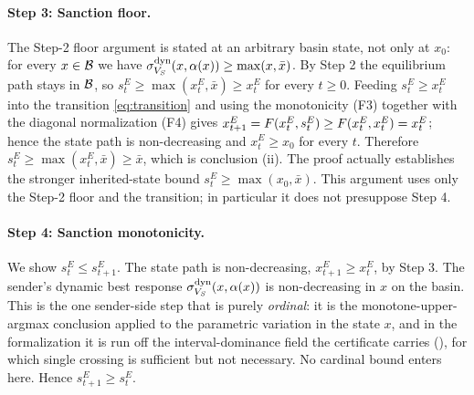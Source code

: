 \paragraph{Step 3: Sanction floor.}
The Step-2 floor argument is stated at an arbitrary basin state, not
only at $x_0$: for every $x\in\mathcal{B}$ we have
$\sigma^{\mathrm{dyn}}_{V_S}(x,\alpha(x))\ge\max(x,\bar x)$. By Step 2 the
equilibrium path stays in $\mathcal{B}$, so $s^E_t\ge\max(x^E_t,\bar
x)\ge x^E_t$ for every $t\ge0$. Feeding $s^E_t\ge x^E_t$ into the
transition \eqref{eq:transition} and using the monotonicity (F3)
together with the diagonal normalization (F4) gives
$x^E_{t+1}=F(x^E_t,s^E_t)\ge F(x^E_t,x^E_t)=x^E_t$; hence the state
path is non-decreasing and $x^E_t\ge x_0$ for every $t$. Therefore
$s^E_t\ge\max(x^E_t,\bar x)\ge\bar x$, which is conclusion (ii).
The proof actually establishes the stronger inherited-state bound
$s^E_t\ge\max(x_0,\bar x)$. This argument uses only the Step-2 floor
and the transition; in particular it does not presuppose Step 4.

\paragraph{Step 4: Sanction monotonicity.}
We show $s^E_t\le s^E_{t+1}$. The state path is non-decreasing,
$x^E_{t+1}\ge x^E_t$, by Step 3. The sender's dynamic best response
$\sigma^{\mathrm{dyn}}_{V_S}(x,\alpha(x))$ is non-decreasing in $x$ on the basin.
This is the one sender-side step that is purely \emph{ordinal}: it is
the monotone-upper-argmax conclusion applied to the parametric
variation in the state $x$, and in the formalization it is run off the
interval-dominance field the certificate carries (), for
which single crossing is sufficient but not necessary. No cardinal
bound enters here. Hence $s^E_{t+1}\ge s^E_t$.

